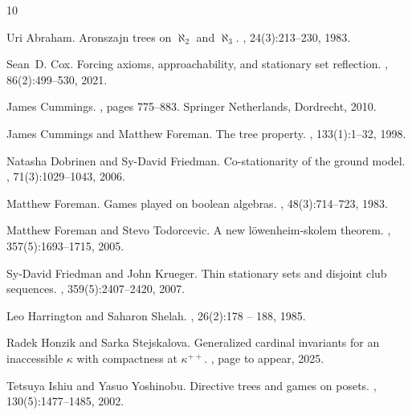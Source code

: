 \documentclass[12pt]{amsart}
\theoremstyle{definition}
\theoremstyle{remark}
\theoremstyle{plain}
\numberwithin{mydef}{section}
\begin{document}
	
	
	\begin{thebibliography}{10}
		
		Uri Abraham.
		\newblock Aronszajn trees on $\aleph_2$ and $\aleph_3$.
		, 24(3):213--230, 1983.
		
		Sean~D. Cox.
		\newblock Forcing axioms, approachability, and stationary set reflection.
		, 86(2):499–530, 2021.
		
		James Cummings.
		, pages 775--883.
		\newblock Springer Netherlands, Dordrecht, 2010.
		
		James Cummings and Matthew Foreman.
		\newblock The tree property.
		, 133(1):1--32, 1998.
		
		Natasha Dobrinen and Sy-David Friedman.
		\newblock Co-stationarity of the ground model.
		, 71(3):1029--1043, 2006.
		
		Matthew Foreman.
		\newblock Games played on boolean algebras.
		, 48(3):714--723, 1983.
		
		Matthew Foreman and Stevo Todorcevic.
		\newblock A new l{\"o}wenheim-skolem theorem.
		, 357(5):1693--1715, 2005.
		
		Sy-David Friedman and John Krueger.
		\newblock Thin stationary sets and disjoint club sequences.
		, 359(5):2407--2420, 2007.
		
		Leo Harrington and Saharon Shelah.
		, 26(2):178 -- 188, 1985.
		
		Radek Honzik and Sarka Stejskalova.
		\newblock Generalized cardinal invariants for an inaccessible $\kappa$ with
		compactness at $\kappa^{++}$.
		, page to appear, 2025.
		
		Tetsuya Ishiu and Yasuo Yoshinobu.
		\newblock Directive trees and games on posets.
		, 130(5):1477--1485, 2002.
		

\end{thebibliography}
\end{document}
